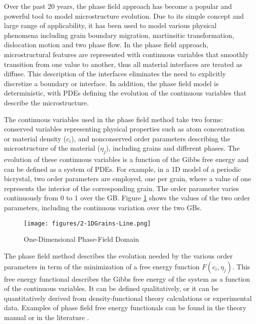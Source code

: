 \documentclass[letter,12pt,fleqn]{article}
\begin{document}
Over the past 20 years, the phase field approach has become a popular and powerful tool to model microstructure evolution. Due to its simple concept and large range of applicability, it has been used to model various physical phenomena including grain boundary migration, martinsitic transformation, dislocation motion and two phase flow. In the phase field approach, microstructural features are represented with continuous variables that smoothly transition from one value to another, thus all material interfaces are treated as diffuse. This description of the interfaces eliminates the need to explicitly discretize a boundary or interface. In addition, the phase field model is deterministic, with PDEs defining the evolution of the continuous variables that describe the microstructure.

The continuous variables used in the phase field method take two forms: conserved variables representing physical properties such as atom concentration or material density ($c_i$), and nonconserved order parameters describing the microstructure of the material ($\eta_j$), including grains and different phases.  The evolution of these continuous variables is a function of the Gibbs free energy and can be defined as a system of PDEs.  For example, in a 1D  model of a periodic bicrystal, two order parameters are employed, one per grain, where a value of one represents the interior of the corresponding grain.  The order parameter varies continuously from 0 to 1 over the GB.  Figure \ref{fig:one} shows the values of the two order parameters, including the continuous variation over the two GBs. 
\begin{figure}[h!]
  \centering
  \texttt{[image: figures/2-1DGrains-Line.png]}
  \caption{One-Dimensional Phase-Field Domain} \label{fig:one}
\end{figure}

The phase field method describes the evolution needed by the various order parameters in term of the minimization of a free energy function $F(c_i,\eta_j)$. This free energy functional describes the Gibbs free energy of the system as a function of the continuous variables. It can be defined qualitatively, or it can be quantitatively derived from density-functional theory calculations or experimental data. Examples of phase field free energy functionals can be found in the theory manual or in the literature \citep{chen2002}.
\end{document}
